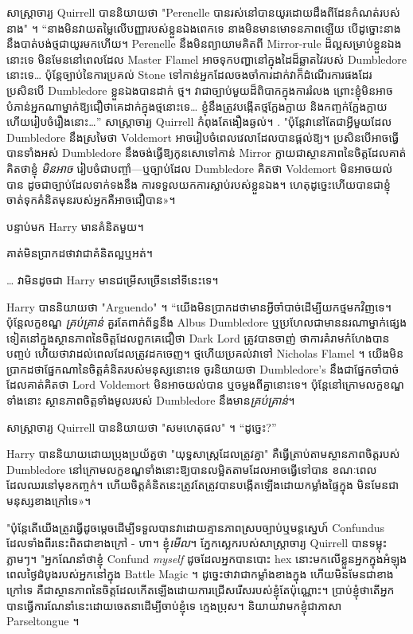 {សាស្រ្តាចារ្យ Quirrell បាននិយាយថា "Perenelle បានរស់នៅបានយូរដោយដឹងពីដែនកំណត់របស់នាង" ។ “នាង​មិន​វាយតម្លៃ​លើ​បញ្ញា​របស់​ខ្លួន​ឯង​ពេក​ទេ នាង​មិន​មាន​មោទនភាព​ឡើយ បើ​ដូច្នោះ​នាង​នឹង​បាត់​បង់​ថ្ម​ជា​យូរ​មក​ហើយ។ Perenelle នឹងមិនព្យាយាមគិតពី Mirror-rule ដ៏ល្អសម្រាប់ខ្លួនឯងនោះទេ មិនមែននៅពេលដែល Master Flamel អាចទុកបញ្ហានៅក្នុងដៃដ៏ឆ្លាតវៃរបស់ Dumbledore នោះទេ… ប៉ុន្តែច្បាប់នៃការប្រគល់ Stone ទៅកាន់អ្នកដែលចងចាំការដាក់វាក៏ដំណើរការផងដែរ ប្រសិនបើ Dumbledore ខ្លួនឯងបានដាក់ ថ្ម។ វា​ជា​ច្បាប់​មួយ​ដ៏​ពិបាក​ក្នុង​ការ​រំលង ព្រោះ​ខ្ញុំ​មិន​អាច​បំភាន់​អ្នក​ណា​ម្នាក់​ឱ្យ​ជឿ​ថា​គេ​ដាក់​ក្នុង​ថ្ម​នោះ​ទេ… ខ្ញុំ​នឹង​ត្រូវ​បង្កើត​ថ្ម​ក្លែងក្លាយ និង​កញ្ចក់​ក្លែងក្លាយ ហើយ​រៀបចំ​រឿង​នោះ…” សាស្ត្រាចារ្យ Quirrell កំពុង​តែ​ងឿង​ឆ្ងល់។ . "ប៉ុន្តែវានៅតែជាអ្វីមួយដែល Dumbledore នឹងស្រមៃថា Voldemort អាចរៀបចំពេលវេលាដែលបានផ្តល់ឱ្យ។ ប្រសិនបើអាចធ្វើបានទាំងអស់ Dumbledore នឹងចង់ធ្វើឱ្យកូនសោទៅកាន់ Mirror ក្លាយជាស្ថានភាពនៃចិត្តដែលគាត់គិតថាខ្ញុំ \emph{មិនអាច} រៀបចំជាបញ្ចាំ—ឬច្បាប់ដែល Dumbledore គិតថា Voldemort មិនអាចយល់បាន ដូចជាច្បាប់ដែលទាក់ទងនឹង ការទទួលយកការស្លាប់របស់ខ្លួនឯង។ ហេតុ​ដូច្នេះ​ហើយ​បាន​ជា​ខ្ញុំ​ចាត់​ទុក​គំនិត​មុន​របស់​អ្នក​គឺ​អាច​ជឿ​បាន»។

បន្ទាប់មក Harry មានគំនិតមួយ។

គាត់​មិន​ប្រាកដ​ថា​វា​ជា​គំនិត​ល្អ​ឬ​អត់។

… វាមិនដូចជា Harry មានជម្រើសច្រើននៅទីនេះទេ។

Harry បាននិយាយថា "Arguendo" ។ “យើង​មិន​ប្រាកដ​ថា​មាន​អ្វី​ចាំបាច់​ដើម្បី​យក​ថ្ម​មក​វិញ​ទេ។ ប៉ុន្តែលក្ខខណ្ឌ \emph{គ្រប់គ្រាន់} គួរតែពាក់ព័ន្ធនឹង Albus Dumbledore ឬប្រហែលជាមាននរណាម្នាក់ផ្សេងទៀតនៅក្នុងស្ថានភាពនៃចិត្តដែលពួកគេជឿថា Dark Lord ត្រូវបានចាញ់ ថាការគំរាមកំហែងបានបញ្ចប់ ហើយថាវាដល់ពេលដែលត្រូវដកចេញ។ ថ្មហើយប្រគល់វាទៅ Nicholas Flamel ។ យើង​មិន​ប្រាកដ​ថា​ផ្នែក​ណា​នៃ​ចិត្ត​គំនិត​របស់​មនុស្ស​នោះ​ទេ ចូរ​និយាយ​ថា Dumbledore's នឹង​ជា​ផ្នែក​ចាំបាច់​ដែល​គាត់​គិត​ថា Lord Voldemort មិន​អាច​យល់​បាន ឬ​ចម្លង​ពី​គ្នា​នោះ​ទេ។ ប៉ុន្តែនៅក្រោមលក្ខខណ្ឌទាំងនោះ ស្ថានភាពចិត្តទាំងមូលរបស់ Dumbledore នឹងមាន\emph{គ្រប់គ្រាន់}។

សាស្រ្តាចារ្យ Quirrell បាននិយាយថា "សមហេតុផល" ។ “ដូច្នេះ?”

Harry បាននិយាយដោយប្រុងប្រយ័ត្នថា "យុទ្ធសាស្រ្តដែលត្រូវគ្នា" គឺធ្វើត្រាប់តាមស្ថានភាពចិត្តរបស់ Dumbledore នៅក្រោមលក្ខខណ្ឌទាំងនោះឱ្យបានលម្អិតតាមដែលអាចធ្វើទៅបាន ខណៈពេលដែលឈរនៅមុខកញ្ចក់។ ហើយ​ចិត្ត​គំនិត​នេះ​ត្រូវ​តែ​ត្រូវ​បាន​បង្កើត​ឡើង​ដោយ​កម្លាំង​ផ្ទៃក្នុង មិន​មែន​ជា​មនុស្ស​ខាង​ក្រៅ​ទេ»។

"ប៉ុន្តែតើយើងត្រូវធ្វើដូចម្តេចដើម្បីទទួលបានវាដោយគ្មានភាពស្របច្បាប់ឬមន្តស្នេហ៍ Confundus ដែលទាំងពីរនេះពិតជាខាងក្រៅ - ហា។ ខ្ញុំ\emph{មើល}។ ភ្នែកស្លេករបស់សាស្រ្តាចារ្យ Quirrell បានទម្លុះភ្លាមៗ។ "អ្នកណែនាំថាខ្ញុំ Confund \emph{myself} ដូចដែលអ្នកបានបោះ hex នោះមកលើខ្លួនអ្នកក្នុងអំឡុងពេលថ្ងៃដំបូងរបស់អ្នកនៅក្នុង Battle Magic ។ ដូច្នេះ​ថា​វា​ជា​កម្លាំង​ខាងក្នុង ហើយ​មិន​មែន​ជា​ខាងក្រៅ​ទេ គឺ​ជា​ស្ថានភាព​នៃ​ចិត្ត​ដែល​កើត​ឡើង​ដោយ​ការ​ជ្រើសរើស​របស់​ខ្ញុំ​តែ​ប៉ុណ្ណោះ។ ប្រាប់ខ្ញុំថាតើអ្នកបានធ្វើការណែនាំនេះដោយចេតនាដើម្បីចាប់ខ្ញុំទេ ក្មេងប្រុស។ និយាយវាមកខ្ញុំជាភាសា Parseltongue ។

}
